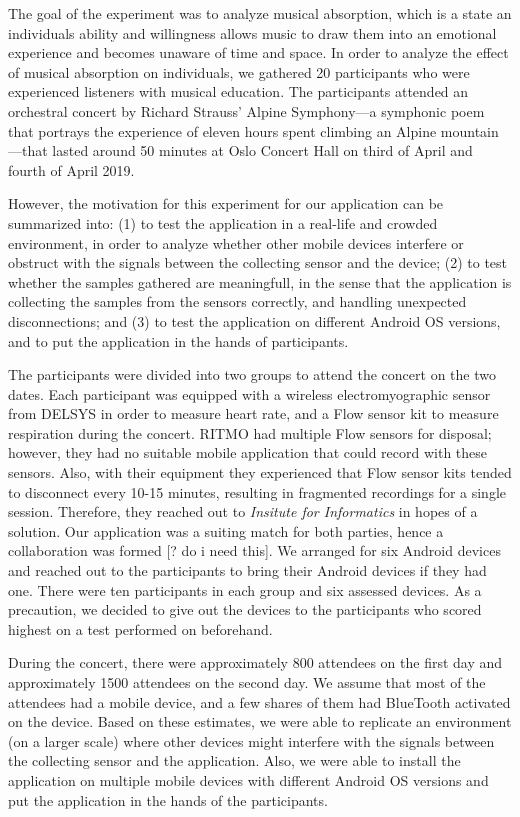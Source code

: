 The goal of the experiment was to analyze musical absorption, which is a state an individuals ability and willingness allows music to draw them into an emotional experience and becomes unaware of time and space. In order to analyze the effect of musical absorption on individuals, we gathered 20 participants who were experienced listeners with musical education. The participants attended an orchestral concert by Richard Strauss' Alpine Symphony---a symphonic poem that portrays the experience of eleven hours spent climbing an Alpine mountain---that lasted around 50 minutes at Oslo Concert Hall on third of April and fourth of April 2019.  

However, the motivation for this experiment for our application can be summarized into: (1) to test the application in a real-life and crowded environment, in order to analyze whether other mobile devices interfere or obstruct with the signals between the collecting sensor and the device; (2) to test whether the samples gathered are meaningfull, in the sense that the application is collecting the samples from the sensors correctly, and handling unexpected disconnections; and (3) to test the application on different Android OS versions, and to put the application in the hands of participants. 

The participants were divided into two groups to attend the concert on the two dates. Each participant was equipped with a wireless electromyographic sensor from DELSYS in order to measure heart rate, and a Flow sensor kit to measure respiration during the concert. RITMO had multiple Flow sensors for disposal; however, they had no suitable mobile application that could record with these sensors. Also, with their equipment they experienced that Flow sensor kits tended to disconnect every 10-15 minutes, resulting in fragmented recordings for a single session. Therefore, they reached out to \textit{Insitute for Informatics} in hopes of a solution. Our application was a suiting match for both parties, hence a collaboration was formed [? do i need this]. We arranged for six Android devices and reached out to the participants to bring their Android devices if they had one. There were ten participants in each group and six assessed devices. As a precaution, we decided to give out the devices to the participants who scored highest on a test performed on beforehand.

During the concert, there were approximately 800 attendees on the first day and approximately 1500 attendees on the second day. We assume that most of the attendees had a mobile device, and a few shares of them had BlueTooth activated on the device. Based on these estimates, we were able to replicate an environment (on a larger scale) where other devices might interfere with the signals between the collecting sensor and the application. Also, we were able to install the application on multiple mobile devices with different Android OS versions and put the application in the hands of the participants. 




